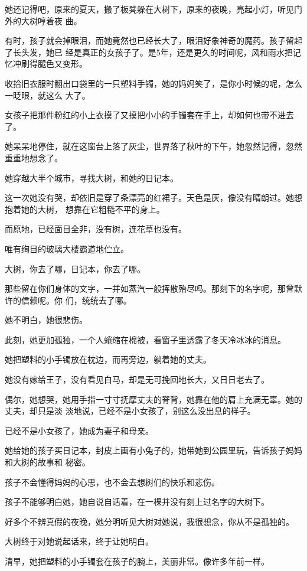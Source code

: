 \documentclass[12pt,a4paper]{article}
\begin{document}
		她还记得吧，原来的夏天，搬了板凳躲在大树下，原来的夜晚，亮起小灯，听见门外的大树哼着夜
	曲。

		有时，孩子就会掉眼泪，而她竟然也已经长大了，眼泪好象神奇的魔药。孩子留起了长头发，她已
	经是真正的女孩子了。是5年，还是更久的时间呢，风和雨水把记忆冲刷得腿色又变形。

		收拾旧衣服时翻出口袋里的一只塑料手镯，她的妈妈笑了，是你小时候的呢，怎么一眨眼，就这么
	大了。

		女孩子把那件粉红的小上衣摸了又摸把小小的手镯套在手上，却如何也带不进去了。

		她呆呆地停住，就在这窗台上落了灰尘，世界落了秋叶的下午，她忽然记得，忽然重重地想念了。

		她穿越大半个城市，寻找大树，和她的日记本。

		这一次她没有哭，却依旧是穿了条漂亮的红裙子。天色是灰，像没有晴朗过。她想抱着她的大树，
	想靠在它粗糙不平的身上。

		而原地，已经面目全非，没有树，连花草也没有。

		唯有绚目的玻璃大楼霸道地伫立。


		大树，你去了哪，日记本，你去了哪。

		那些留在你们身体的文字，一并如蒸汽一般挥散殆尽吗。那刻下的名字呢，那曾默许的信赖呢。你
	们，统统去了哪。


		她不明白，她很悲伤。

		此刻，她更加孤独，一个人蜷缩在棉被，看窗子里透露了冬天冷冰冰的消息。

		她把塑料的小手镯放在枕边，而再旁边，躺着她的丈夫。

		她没有嫁给王子，没有看见白马，却是无可挽回地长大，又日日老去了。

		偶尔，她想哭，她用手指一寸寸抚摩丈夫的脊背，她靠在他的肩上充满无辜。她的丈夫，却只是淡
	淡地说，已经不是小女孩了，别这么没出息的样子。

		已经不是小女孩了，她成为妻子和母亲。

		她给她的孩子买日记本，封皮上画有小兔子的，她带她到公园里玩，告诉孩子妈妈和大树的故事和
	秘密。

		孩子不会懂得妈妈的心思，也不会去想树们的快乐和悲伤。

		孩子不能够明白她，她自说自话着，在一棵并没有刻上过名字的大树下。


		好多个不辨真假的夜晚，她分明听见大树对她说，我很想念，你从不是孤独的。

		大树终于对她说起话来，终于让她明白。


		清早，她把塑料的小手镯套在孩子的腕上，美丽非常。像许多年前一样。
\end{document}
